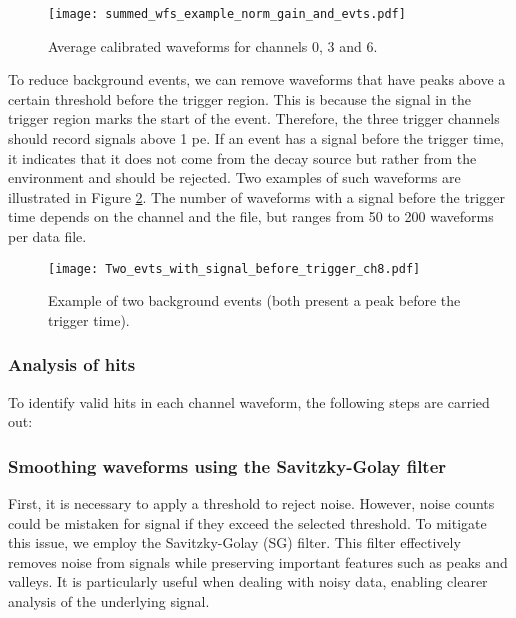 \documentclass[11pt,a4paper,english,oneside, pdf]{article}
\begin{document}
	\begin{figure}[!h]
		\begin{center}
			\texttt{[image: summed\_wfs\_example\_norm\_gain\_and\_evts.pdf]}
			\caption{Average calibrated waveforms for channels 0, 3 and 6.}
			\label{fig:summed_wfs_example}
		\end{center}
	\end{figure}
	
	
	To reduce background events, we can remove waveforms that have peaks above a certain threshold before the trigger region. This is because the signal in the trigger region marks the start of the event. Therefore, the three trigger channels should record signals above 1 pe. If an event has a signal before the trigger time, it indicates that it does not come from the decay source but rather from the environment and should be rejected. Two examples of such waveforms are illustrated in Figure \ref{fig:Two_evts_with_signal_before_trigger_ch8}. The number of waveforms with a signal before the trigger time depends on the channel and the file, but ranges from 50 to 200 waveforms per data file.
	
	\begin{figure}[!h]
		\begin{center}
			\texttt{[image: Two\_evts\_with\_signal\_before\_trigger\_ch8.pdf]}
			\caption{Example of two background events (both present a peak before the trigger time).}
			\label{fig:Two_evts_with_signal_before_trigger_ch8}
		\end{center}
	\end{figure}
	
	\subsubsection{Analysis of hits}
	
	To identify valid hits in each channel waveform, the following steps are carried out:
	
	\subsubsection*{Smoothing waveforms using the Savitzky-Golay filter}
	
	First, it is necessary to apply a threshold to reject noise. However, noise counts could be mistaken for signal if they exceed the selected threshold. To mitigate this issue, we employ the Savitzky-Golay (SG) filter. This filter effectively removes noise from signals while preserving important features such as peaks and valleys. It is particularly useful when dealing with noisy data, enabling clearer analysis of the underlying signal.
	
\end{document}
